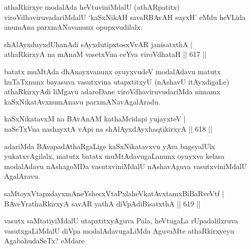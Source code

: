 \begin{artha}
athaRkirxye modalAda heVtuviniMdalU (athARpatitx) viroVdhaviruvadariMdalU `kaSxNikAH savaRBAvAH suyxH' eMdu heVLida anumAna parxmANavanunx opupxvudilalx.
\end{artha}


\begin{shl}
shAlAyxduyxdUhanAdi sAyxdutipxtosxVvAR janisatxthA | \\
athaRkirxyA na mAnaM vasetxVna ceYva viroVdhataH \hfill||  617 ||  
\end{shl}

\begin{artha}
batatx muMtAda dhAnayxvanunx oyuyxvudeV modalAdavu matutx huTaTxnunx bayasuva vasutxvina utapxtitxyU (nAshavU itAyxdigaLe) athaRkirxyAdi liMgavu adaroDane viroVdhaviruvudariMda nimamx kaSxNikatAvxnumAnavu parxmANavAgalAradu.
\end{artha}

\begin{shl}
kaSxNikatavxM na BAvAnAM kathaMcidapi yujayxteV | \\
naSeTxVna nashayxtA vA\s pi na shAlAyxdAyxhaqtikirxyA \hfill||  618 ||  
\end{shl}

\begin{artha}
adariMda BAvapadAthaRgaLige kaSxNikatavxvu yAva bageyalUlx yukatxvAgilalx, matutx batatx muMtAdavugaLanunx oyuyxva kelasa modalAdavu nAshagoMDa vasutxviniMdalU nAshavAguva vasutxviniMdalU AgalAravu.
\end{artha}


\begin{shl}
saMtoyxVtapxdayxmAneYshecxVtaPxlaheVkatAvxtamxBiBaRveVtf | \\
BAveYrathaRkirxyA savAR yathA \footnotemark[1]diVpAdiBisatxthA \hfill||  619 ||  
\end{shl}

\begin{artha}
vasutx saMtatiyiMdalU utapxtitxyAguva Pala, heVtugaLa rUpadalilxruva vasutxgaLiMdalU diVpa modalAdavugaLiMda AguvaMte athaRkirxyeyu AgabahudaSeTx? eMdare
\end{artha}

